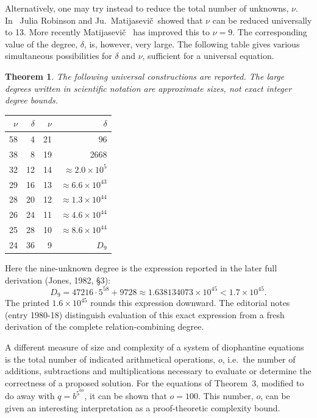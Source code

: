 \documentclass[11pt,letterpaper]{article}
\newcommand{\origpage}[1]{\marginnote{\footnotesize\textbf{[#1]}}}
\newtheorem{theorem}{Theorem}
\newcommand{\Matijasevic}{Matijasevi\v{c}}
\begin{document}
Alternatively, one may try instead to reduce the total number of
unknowns, $\nu$. In~\cite{MR75} Julia Robinson and Ju.~\Matijasevic\ showed
that $\nu$ can be reduced universally to 13. More recently
\Matijasevic~\cite{Mat77} has improved this to $\nu=9$. The corresponding
value of the degree, $\delta$, is, however, very large. The following
table gives various simultaneous possibilities for $\delta$ and $\nu$,
sufficient for a universal equation.

\begin{theorem}
The following universal constructions are reported. The large degrees
written in scientific notation are approximate sizes, not exact
integer degree bounds.
\end{theorem}
\begin{center}
\renewcommand{\arraystretch}{1.13}
\begin{tabular}{@{}rr@{\qquad\qquad}rr@{}}
\toprule
$\nu$ & $\delta$ & $\nu$ & $\delta$\\
\midrule
58 & 4  & 21 & 96\\
38 & 8  & 19 & 2668\\
32 & 12 & 14 & $\approx 2.0\times10^5$\\
29 & 16 & 13 & $\approx 6.6\times10^{43}$\\
28 & 20 & 12 & $\approx 1.3\times10^{44}$\\
26 & 24 & 11 & $\approx 4.6\times10^{44}$\\
25 & 28 & 10 & $\approx 8.6\times10^{44}$\\
24 & 36 & 9  & $D_9$\\
\bottomrule
\end{tabular}
\end{center}
\noindent Here the nine-unknown degree is the expression reported in the
later full derivation (Jones, 1982, \S3):
\[
 D_9=47216\cdot5^{58}+9728
     \approx1.638134073\times10^{45}<1.7\times10^{45}.
\]
\noindent The printed $1.6\times10^{45}$ rounds this expression downward.
The editorial notes (entry 1980-18) distinguish evaluation of this exact expression
from a fresh derivation of the complete relation-combining degree.


\origpage{862}A different measure of size and complexity of a system of diophantine
equations is the total number of indicated arithmetical operations, $o$,
i.e.\ the number of additions, subtractions and multiplications necessary
to evaluate or determine the correctness of a proposed solution. For the
equations of Theorem~3, modified to do away with $q=b^{5^{60}}$, it can be
shown that $o=100$. This number, $o$, can be given an interesting
interpretation as a proof-theoretic complexity bound.
\end{document}
